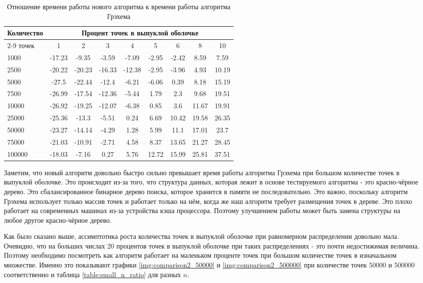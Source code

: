 \begin{table}[H]
	\centering
	\caption{Отношение времени работы нового алгоритма к времени работы алгоритма Грэхема}
	\label{table:ratio}
	\begin{tabular}{|l|c|c|c|c|c|c|c|c|}
\hline
\multirow{2}{*}{Количество} & \multicolumn{8}{c|}{Процент точек в выпуклой оболочке} \\ \cline{2-9}
точек& 1 & 2 & 3 & 4 & 5 & 6 & 8 & 10 \\ \hline
1000  &  -17.23 & -9.35  & -3.59  & -7.09  & -2.95 & -2.42 &  8.59 & 7.59  \\ \hline
2500  &  -20.22 & -20.23 & -16.33 & -12.38 & -2.95 & -3.96 &  4.93 & 10.19 \\ \hline
5000  &  -27.5  & -22.44 & -12.4  & -6.21  & -6.06 &  0.39 &  8.18 & 15.19 \\ \hline
7500  &  -26.99 & -17.54 & -12.36 & -5.44  &  1.79 &  2.3  &  9.68 & 19.51 \\ \hline
10000 &  -26.92 & -19.25 & -12.07 & -6.38  &  0.85 &  3.6  & 11.67 & 19.91 \\ \hline
25000 &  -25.36 & -13.3  & -5.51  &  0.24  &  6.69 & 10.42 & 19.58 & 26.35 \\ \hline
50000 &  -23.27 & -14.14 & -4.29  &  1.28  &  5.99 & 11.1  & 17.01 & 23.7  \\ \hline
75000 &  -21.03 & -10.91 & -2.71  &  4.58  &  8.37 & 13.65 & 21.27 & 28.45 \\ \hline
100000&  -18.03 & -7.16  &  0.27  &  5.76  & 12.72 & 15.99 & 25.81 & 37.51 \\ \hline
	\end{tabular}
\end{table}

Заметим, что новый алгоритм довольно быстро сильно превышает время работы алгоритма Грэхема при большом количестве точек в выпуклой оболочке. Это происходит из-за того, что структура данных, которая лежит в основе тестируемого алгоритма - это красно-чёрное дерево. Это сбалансированное бинарное дерево поиска, которое хранится в памяти не последовательно. Это важно, поскольку алгоритм Грэхема использует только массив точек и работает только на нём, когда же наш алгоритм требует размещения точек в дереве. Это плохо работает на современных машинах из-за устройства кэша процессора. Поэтому улучшением работы может быть замена структуры на любое другое красно-чёрное дерево.

Как было сказано выше, ассимптотика роста количества точек в выпуклой оболочке при равномерном распределении довольно мала. Очевидно, что на больших числах 20 процентов точек в выпуклой оболочке при таких распределениях - это почти недостижимая величина. Поэтому необходимо посмотреть как алгоритм работает на маленьком проценте точек при большом количестве точек в изначальном множестве. Именно это показывают графики \ref{img:comparison2_50000} и \ref{img:comparison2_500000} при количестве точек 50000 и 500000 соответственно и таблица \ref{table:small_n_ratio} для разных $n$.

